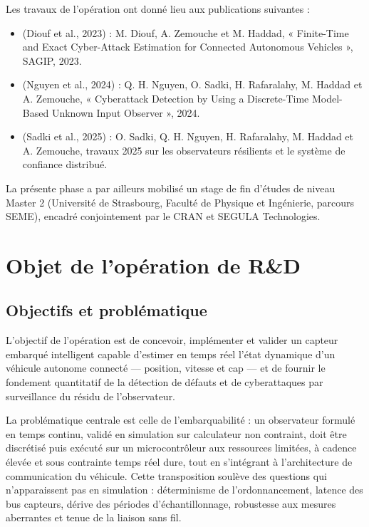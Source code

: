 Les travaux de l’opération ont donné lieu aux publications suivantes :

\begin{itemize}
\item (Diouf et al., 2023) : M. Diouf, A. Zemouche et M. Haddad, « Finite-Time and Exact Cyber-Attack Estimation for Connected Autonomous Vehicles », SAGIP, 2023.
\item (Nguyen et al., 2024) : Q. H. Nguyen, O. Sadki, H. Rafaralahy, M. Haddad et A. Zemouche, « Cyberattack Detection by Using a Discrete-Time Model-Based Unknown Input Observer », 2024.
\item (Sadki et al., 2025) : O. Sadki, Q. H. Nguyen, H. Rafaralahy, M. Haddad et A. Zemouche, travaux 2025 sur les observateurs résilients et le système de confiance distribué.
\end{itemize}

La présente phase a par ailleurs mobilisé un stage de fin d’études de niveau Master 2 (Université de Strasbourg, Faculté de Physique et Ingénierie, parcours SEME), encadré conjointement par le CRAN et SEGULA Technologies.

\section{Objet de l’opération de R\&D}

\subsection{Objectifs et problématique}

L’objectif de l’opération est de concevoir, implémenter et valider un capteur embarqué intelligent capable d’estimer en temps réel l’état dynamique d’un véhicule autonome connecté — position, vitesse et cap — et de fournir le fondement quantitatif de la détection de défauts et de cyberattaques par surveillance du résidu de l’observateur.

La problématique centrale est celle de l’embarquabilité : un observateur formulé en temps continu, validé en simulation sur calculateur non contraint, doit être discrétisé puis exécuté sur un microcontrôleur aux ressources limitées, à cadence élevée et sous contrainte temps réel dure, tout en s’intégrant à l’architecture de communication du véhicule. Cette transposition soulève des questions qui n’apparaissent pas en simulation : déterminisme de l’ordonnancement, latence des bus capteurs, dérive des périodes d’échantillonnage, robustesse aux mesures aberrantes et tenue de la liaison sans fil.

